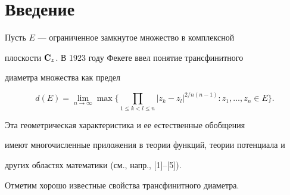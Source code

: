 \pagestyle{plain} %







\maketitle


\label{begin}





\section*{Введение}





Пусть $E$ --- ограниченное замкнутое множество в комплексной


плоскости $\bold C_z$.  В 1923 году Фекете ввел понятие трансфинитного


диаметра множества как предел


$$


d(E)=\lim_{n\to\infty}\max\bigg\{


\prod_{1\leq k<l\leq n}|z_k-z_l|^{2/n(n-1)}:


z_1,\dotsc,z_n\in E\bigg\}.


$$


Эта геометрическая характеристика и ее естественные обобщения


имеют многочисленные приложения в теории функций, теории потенциала и


других областях математики (см., напр., [1]--[5]).


Отметим хорошо известные свойства трансфинитного диаметра.


